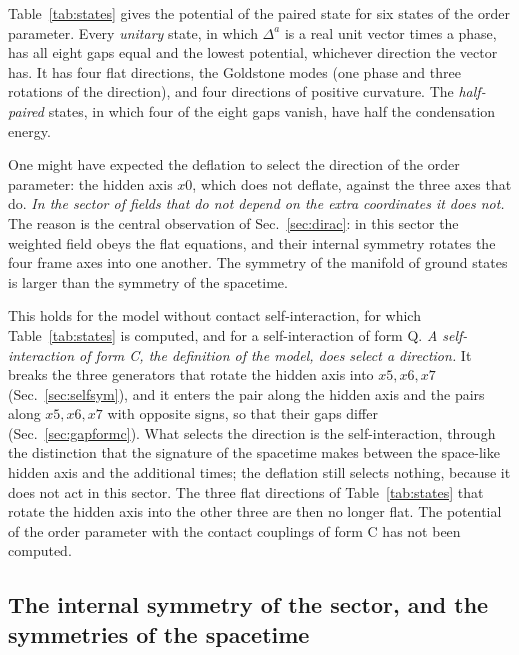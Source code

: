 Table~\ref{tab:states} gives the potential of the paired state for six states of the order
parameter. Every \emph{unitary} state, in which $\Delta^{a}$ is a real unit vector times a phase, has
all eight gaps equal and the lowest potential, whichever direction the vector has. It has four flat
directions, the Goldstone modes (one phase and three rotations of the direction), and four
directions of positive curvature. The \emph{half-paired} states, in which four of the eight gaps
vanish, have half the condensation energy.

One might have expected the deflation to select the direction of the order parameter: the hidden
axis $x0$, which does not deflate, against the three axes that do. \emph{In the sector of fields
that do not depend on the extra coordinates it does not.} The reason is the central observation of
Sec.~\ref{sec:dirac}: in this sector the weighted field obeys the flat equations, and their internal
symmetry rotates the four frame axes into one another. The symmetry of the manifold of ground states
is larger than the symmetry of the spacetime.

This holds for the model without contact self-interaction, for which Table~\ref{tab:states} is
computed, and for a self-interaction of form Q. \emph{A self-interaction of form C, the definition
of the model, does select a direction.} It breaks the three generators that rotate the hidden axis
into $x5,x6,x7$ (Sec.~\ref{sec:selfsym}), and it enters the pair along the hidden axis and the pairs
along $x5,x6,x7$ with opposite signs, so that their gaps differ (Sec.~\ref{sec:gapformc}). What
selects the direction is the self-interaction, through the distinction that the signature of the
spacetime makes between the space-like hidden axis and the additional times; the deflation still
selects nothing, because it does not act in this sector. The three flat directions of
Table~\ref{tab:states} that rotate the hidden axis into the other three are then no longer flat. The
potential of the order parameter with the contact couplings of form C has not been computed.

\subsection{The internal symmetry of the sector, and the symmetries of the spacetime}
\label{sec:hidden}

